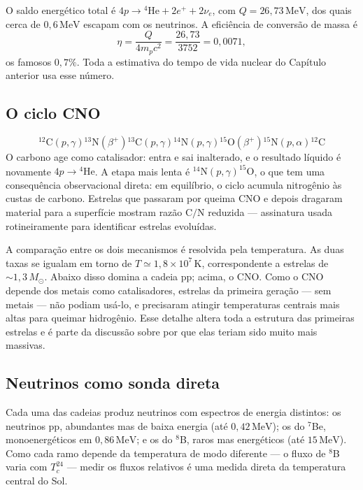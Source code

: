 \documentclass[11pt,a4paper]{article}
\begin{document}
O saldo energético total é $4p\to{}^{4}\mathrm{He}+2e^{+}+2\nu_e$, com $Q=26{,}73\,\mathrm{MeV}$, dos quais cerca de $0{,}6\,\mathrm{MeV}$ escapam com os neutrinos. A eficiência de conversão de massa é
\[
\eta=\frac{Q}{4m_pc^{2}}=\frac{26{,}73}{3752}=0{,}0071,
\]
os famosos $0{,}7\%$. Toda a estimativa do tempo de vida nuclear do Capítulo anterior usa esse número.

\subsection*{O ciclo CNO}

\[
{}^{12}\mathrm{C}(p,\gamma){}^{13}\mathrm{N}(\beta^{+}){}^{13}\mathrm{C}(p,\gamma){}^{14}\mathrm{N}(p,\gamma){}^{15}\mathrm{O}(\beta^{+}){}^{15}\mathrm{N}(p,\alpha){}^{12}\mathrm{C}
\]
O carbono age como catalisador: entra e sai inalterado, e o resultado líquido é novamente $4p\to{}^{4}\mathrm{He}$. A etapa mais lenta é $^{14}\mathrm{N}(p,\gamma)^{15}\mathrm{O}$, o que tem uma consequência observacional direta: em equilíbrio, o ciclo acumula nitrogênio às custas de carbono. Estrelas que passaram por queima CNO e depois dragaram material para a superfície mostram razão $\mathrm{C/N}$ reduzida --- assinatura usada rotineiramente para identificar estrelas evoluídas.

A comparação entre os dois mecanismos é resolvida pela temperatura. As duas taxas se igualam em torno de $T\simeq1{,}8\times10^{7}\,\mathrm{K}$, correspondente a estrelas de $\sim1{,}3\,M_\odot$. Abaixo disso domina a cadeia pp; acima, o CNO. Como o CNO depende dos metais como catalisadores, estrelas da primeira geração --- sem metais --- não podiam usá-lo, e precisaram atingir temperaturas centrais mais altas para queimar hidrogênio. Esse detalhe altera toda a estrutura das primeiras estrelas e é parte da discussão sobre por que elas teriam sido muito mais massivas.

\subsection*{Neutrinos como sonda direta}

Cada uma das cadeias produz neutrinos com espectros de energia distintos: os neutrinos pp, abundantes mas de baixa energia (até $0{,}42\,\mathrm{MeV}$); os do $^{7}$Be, monoenergéticos em $0{,}86\,\mathrm{MeV}$; e os do $^{8}$B, raros mas energéticos (até $15\,\mathrm{MeV}$). Como cada ramo depende da temperatura de modo diferente --- o fluxo de $^{8}$B varia com $T_c^{24}$ --- medir os fluxos relativos é uma medida direta da temperatura central do Sol.
\end{document}
